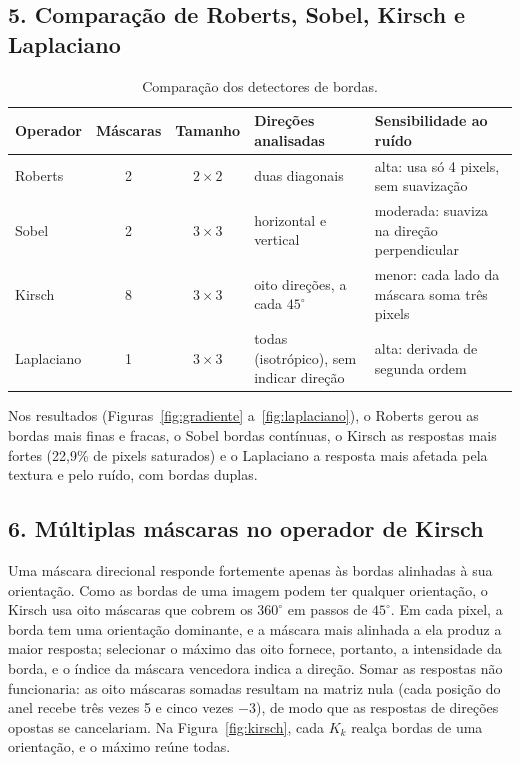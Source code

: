 \documentclass[11pt,a4paper]{article}
\begin{document}
\subsection*{5. Comparação de Roberts, Sobel, Kirsch e Laplaciano}

\begin{table}[H]
\centering
\small
\begin{tabularx}{\textwidth}{lccXX}
\toprule
\textbf{Operador} & \textbf{Máscaras} & \textbf{Tamanho} & \textbf{Direções analisadas} & \textbf{Sensibilidade ao ruído} \\
\midrule
Roberts    & 2 & $2 \times 2$ & duas diagonais & alta: usa só 4 pixels, sem suavização \\
Sobel      & 2 & $3 \times 3$ & horizontal e vertical & moderada: suaviza na direção perpendicular \\
Kirsch     & 8 & $3 \times 3$ & oito direções, a cada $45^\circ$ & menor: cada lado da máscara soma três pixels \\
Laplaciano & 1 & $3 \times 3$ & todas (isotrópico), sem indicar direção & alta: derivada de segunda ordem \\
\bottomrule
\end{tabularx}
\caption{Comparação dos detectores de bordas.}
\end{table}

Nos resultados (Figuras~\ref{fig:gradiente} a~\ref{fig:laplaciano}), o Roberts gerou as bordas
mais finas e fracas, o Sobel bordas contínuas, o Kirsch as respostas mais fortes (22,9\% de
pixels saturados) e o Laplaciano a resposta mais afetada pela textura e pelo ruído, com bordas
duplas.

\subsection*{6. Múltiplas máscaras no operador de Kirsch}

Uma máscara direcional responde fortemente apenas às bordas alinhadas à sua orientação. Como as
bordas de uma imagem podem ter qualquer orientação, o Kirsch usa oito máscaras que cobrem os
$360^\circ$ em passos de $45^\circ$. Em cada pixel, a borda tem uma orientação dominante, e a
máscara mais alinhada a ela produz a maior resposta; selecionar o máximo das oito fornece,
portanto, a intensidade da borda, e o índice da máscara vencedora indica a direção. Somar as
respostas não funcionaria: as oito máscaras somadas resultam na matriz nula (cada posição do
anel recebe três vezes 5 e cinco vezes $-3$), de modo que as respostas de direções opostas se
cancelariam. Na Figura~\ref{fig:kirsch}, cada $K_k$ realça bordas de uma orientação, e o máximo
reúne todas.
\end{document}
